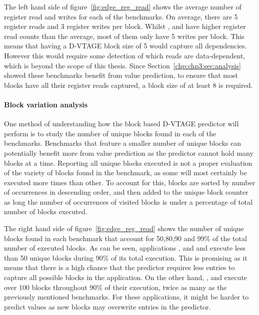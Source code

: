 The left hand side of figure~\ref{fig:edge_reg_read} shows the average number of register read and writes for each of the benchmarks.
On average, there are 5 register reads and 3 register writes per block.
Whilst  ,  and  have higher register read counts than the average, most of them only have 5 writes per block.
This means that having a D-VTAGE block size of 5 would capture all dependencies.
However this would require some detection of which reads are data-dependent, which is beyond the scope of this thesis.
Since Section~\ref{chp:chp3:sec:analysis} showed these benchmarks benefit from value prediction, to ensure that most blocks have all their register reads captured, a block size of at least 8 is required.

\paragraph*{Block variation analysis}



One method of understanding how the block based D-VTAGE predictor will perform is to study the number of unique blocks found in each of the benchmarks.
Benchmarks that feature a smaller number of unique blocks can potentially benefit more from value prediction as the predictor cannot hold many blocks at a time.
Reporting all unique blocks executed is not a proper evaluation of the variety of blocks found in the benchmark, as some will most certainly be executed more times than other.
To account for this, blocks are sorted by number of occurrences in descending order, and then added to the unique block counter as long the number of occurrences of visited blocks is under a percentage of total number of blocks executed.

The right hand side of figure~\ref{fig:edge_reg_read} shows the number of unique blocks found in each benchmark that account for 50,80,90 and 99\% of the total number of executed blocks.
As can be seen, applications ,  and   and  execute less than 50 unique blocks during 90\% of its total execution.
This is promising as it means that there is a high chance that the predictor requires less entries to capture all possible blocks in the application.
On the other hand, , and  execute over 100 blocks throughout 90\% of their execution, twice as many as the previously mentioned benchmarks.
For these applications, it might be harder to predict values as new blocks may overwrite entries in the predictor.


